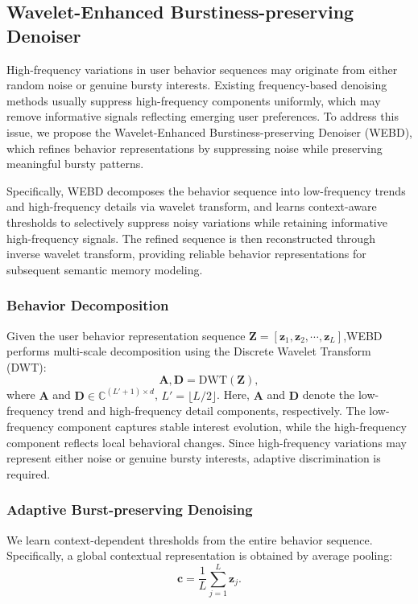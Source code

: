 \documentclass[letterpaper]{article} %
\theoremstyle{definition} %
\begin{document}
\subsection{Wavelet-Enhanced Burstiness-preserving Denoiser}

High-frequency variations in user behavior sequences may originate from either random noise or genuine bursty interests. Existing frequency-based denoising methods usually suppress high-frequency components uniformly, which may remove informative signals reflecting emerging user preferences. To address this issue, we propose the Wavelet-Enhanced Burstiness-preserving Denoiser (WEBD), which refines behavior representations by suppressing noise while preserving meaningful bursty patterns.

Specifically, WEBD decomposes the behavior sequence into low-frequency trends and high-frequency details via wavelet transform, and learns context-aware thresholds to selectively suppress noisy variations while retaining informative high-frequency signals. The refined sequence is then reconstructed through inverse wavelet transform, providing reliable behavior representations for subsequent semantic memory modeling.

\subsubsection{Behavior Decomposition}

Given the user behavior representation sequence  $\bm{Z}=[\bm{z}_1,\bm{z}_2,\cdots,\bm{z}_L]$,WEBD performs multi-scale decomposition using the Discrete Wavelet Transform (DWT):
\begin{equation}
\bm{A}, \bm{D} = \text{DWT}(\bm{Z}),
\end{equation}
where $\bm{A}$ and $\bm{D} \in \mathbb{C}^{(L' + 1) \times d}$, $L'=\lfloor L /2 \rfloor$. Here, $\bm{A}$ and $\bm{D}$ denote the low-frequency trend and high-frequency detail components, respectively. The low-frequency component captures stable interest evolution, while the high-frequency component reflects local behavioral changes. Since high-frequency variations may represent either noise or genuine bursty interests, adaptive discrimination is required.

\subsubsection{Adaptive Burst-preserving Denoising}

We learn context-dependent thresholds from the entire behavior sequence. Specifically, a global contextual representation is obtained by average pooling:
\begin{equation}
\bm{c} = \frac{1}{L}\sum_{j=1}^{L}\bm{z}_j.
\end{equation}
\end{document}
